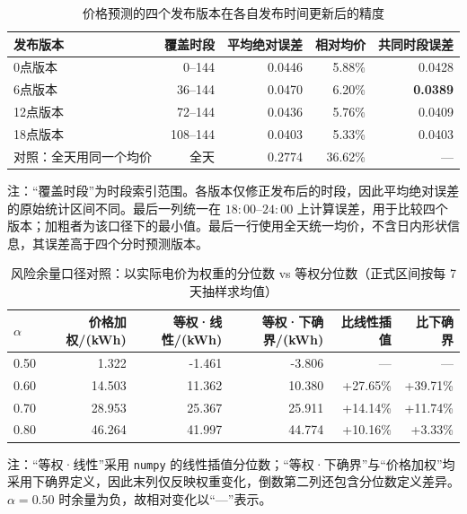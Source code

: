 \begin{table}[htbp]
  \centering
  \caption{价格预测的四个发布版本在各自发布时间更新后的精度}
  \label{tab:p4-skill}
  \small
  \begin{tabular}{lrrrr}
    \toprule
    发布版本 & 覆盖时段 & 平均绝对误差 & 相对均价 & 共同时段误差 \\
    \midrule
    0点版本 & 0--144 & 0.0446 & 5.88\% & 0.0428 \\
    6点版本 & 36--144 & 0.0470 & 6.20\% & \textbf{0.0389} \\
    12点版本 & 72--144 & 0.0436 & 5.76\% & 0.0409 \\
    18点版本 & 108--144 & 0.0403 & 5.33\% & 0.0403 \\
    \midrule
    对照：全天用同一个均价 & 全天 & 0.2774 & 36.62\% & --- \\
    \bottomrule
  \end{tabular}
  \par\vspace{2pt}
  \begin{minipage}{\textwidth}\footnotesize
    注：“覆盖时段”为时段索引范围。各版本仅修正发布后的时段，因此平均绝对误差的原始统计区间不同。最后一列统一在 $18{:}00$--$24{:}00$ 上计算误差，用于比较四个版本；加粗者为该口径下的最小值。最后一行使用全天统一均价，不含日内形状信息，其误差高于四个分时预测版本。
  \end{minipage}
\end{table}

\begin{table}[htbp]
  \centering
  \caption{风险余量口径对照：以实际电价为权重的分位数 vs 等权分位数（正式区间按每 7 天抽样求均值）}
  \label{tab:p4-risk}
  \small
  \begin{tabular}{lrrrrr}
    \toprule
    $\alpha$ & 价格加权/(kWh) & 等权·线性/(kWh) & 等权·下确界/(kWh) & 比线性插值 & 比下确界 \\
    \midrule
    0.50 & 1.322 & -1.461 & -3.806 & --- & --- \\
    0.60 & 14.503 & 11.362 & 10.380 & +27.65\% & +39.71\% \\
    0.70 & 28.953 & 25.367 & 25.911 & +14.14\% & +11.74\% \\
    0.80 & 46.264 & 41.997 & 44.774 & +10.16\% & +3.33\% \\
    \bottomrule
  \end{tabular}
  \par\vspace{2pt}
  \begin{minipage}{\textwidth}\footnotesize
    注：“等权·线性”采用 \texttt{numpy} 的线性插值分位数；“等权·下确界”与“价格加权”均采用下确界定义，因此末列仅反映权重变化，倒数第二列还包含分位数定义差异。$\alpha=0.50$ 时余量为负，故相对变化以“---”表示。
  \end{minipage}
\end{table}

